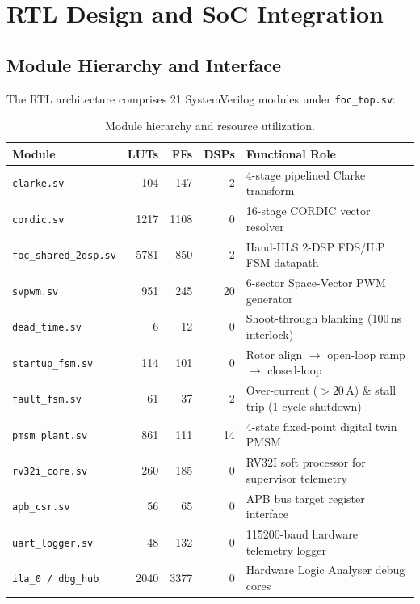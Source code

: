 \documentclass[11pt,a4paper]{article}
\begin{document}
\section{RTL Design and SoC Integration}
\label{sec:rtl}

\subsection{Module Hierarchy and Interface}
The RTL architecture comprises 21 SystemVerilog modules under \texttt{foc\_top.sv}:

\begin{table}[H]\centering\small
\caption{Module hierarchy and resource utilization.}\label{tab:modules}
\begin{tabular}{@{}lrrrl@{}}
\toprule
Module & LUTs & FFs & DSPs & Functional Role\\
\midrule
\texttt{clarke.sv} & 104 & 147 & 2 & 4-stage pipelined Clarke transform\\
\texttt{cordic.sv} & 1217 & 1108 & 0 & 16-stage CORDIC vector resolver\\
\texttt{foc\_shared\_2dsp.sv} & 5781 & 850 & 2 & Hand-HLS 2-DSP FDS/ILP FSM datapath\\
\texttt{svpwm.sv} & 951 & 245 & 20 & 6-sector Space-Vector PWM generator\\
\texttt{dead\_time.sv} & 6 & 12 & 0 & Shoot-through blanking (100\,ns interlock)\\
\texttt{startup\_fsm.sv} & 114 & 101 & 0 & Rotor align $\to$ open-loop ramp $\to$ closed-loop\\
\texttt{fault\_fsm.sv} & 61 & 37 & 2 & Over-current ($>20$\,A) \& stall trip (1-cycle shutdown)\\
\texttt{pmsm\_plant.sv} & 861 & 111 & 14 & 4-state fixed-point digital twin PMSM\\
\texttt{rv32i\_core.sv} & 260 & 185 & 0 & RV32I soft processor for supervisor telemetry\\
\texttt{apb\_csr.sv} & 56 & 65 & 0 & APB bus target register interface\\
\texttt{uart\_logger.sv} & 48 & 132 & 0 & 115200-baud hardware telemetry logger\\
\texttt{ila\_0 / dbg\_hub} & 2040 & 3377 & 0 & Hardware Logic Analyser debug cores\\
\bottomrule
\end{tabular}
\end{table}
\end{document}
